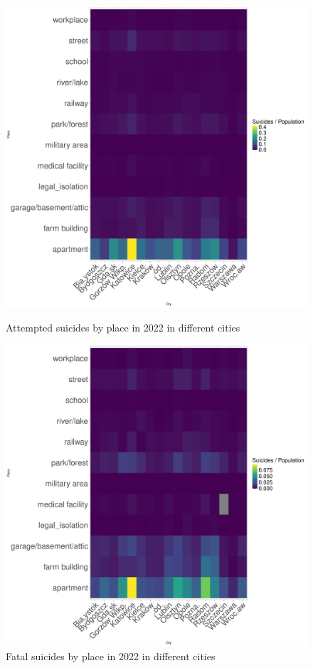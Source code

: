 \documentclass{article}
\begin{document}
\begin{figure}[H]
    \centering
    \begin{minipage}{0.55\textwidth}
        \includegraphics[width=\textwidth]{imgs/place_city_op-att-2022.pdf}
        \caption{Attempted suicides by place  in 2022 in different cities}
	\label{fig:place_city_op-att-2022}
    \end{minipage}
    \hfill
    \begin{minipage}{0.55\textwidth}
        \includegraphics[width=\textwidth]{imgs/place_city_op-fat-2022.pdf}
        \caption{Fatal suicides by place  in 2022 in different cities}
	\label{fig:place_city_op-fat-2022}
    \end{minipage}
\end{figure}
\end{document}
